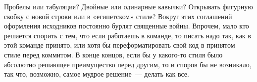 Пробелы или табуляция? Двойные или одинарные кавычки? Открывать фигурную скобку с новой строки или в «египетском» стиле? Вокруг этих соглашений оформления исходников постоянно бурлят священные войны. Впрочем, мало кто решается спорить с тем, что если работаешь в команде, то писать надо так, как в этой команде принято, или хотя бы переформатировать свой код в принятом стиле перед коммитом. В конце концов, если бы у какого-то стиля было абсолютно решающее преимущество перед другим, то и споров бы не возникало, так что, возможно, самое мудрое решение~--- делать как все. 